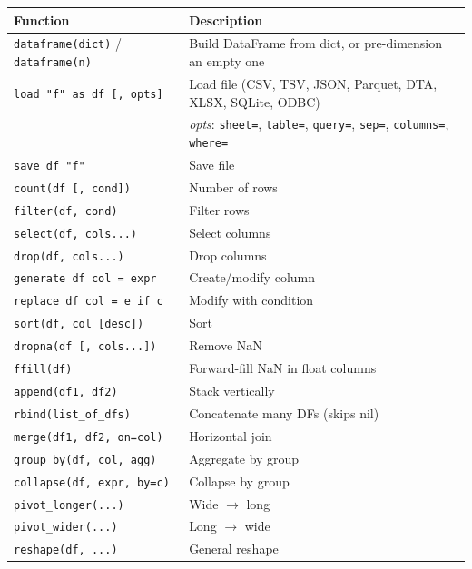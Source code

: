 \begin{center}
\begin{tabular}{ll}
\toprule
\textbf{Function} & \textbf{Description} \\
\midrule
\texttt{dataframe(dict)} / \texttt{dataframe(n)} & Build DataFrame from dict, or pre-dimension an empty one \\
\texttt{load "f" as df [, opts]}  & Load file (CSV, TSV, JSON, Parquet, DTA, XLSX, SQLite, ODBC) \\
                                  & \quad \textit{opts}: \texttt{sheet=}, \texttt{table=}, \texttt{query=}, \texttt{sep=}, \texttt{columns=}, \texttt{where=} \\
\texttt{save df "f"}              & Save file \\
\texttt{count(df [, cond])}       & Number of rows \\
\texttt{filter(df, cond)}         & Filter rows \\
\texttt{select(df, cols...)}      & Select columns \\
\texttt{drop(df, cols...)}        & Drop columns \\
\texttt{generate df col = expr}   & Create/modify column \\
\texttt{replace df col = e if c}  & Modify with condition \\
\texttt{sort(df, col [desc])}     & Sort \\
\texttt{dropna(df [, cols...])}   & Remove NaN \\
\texttt{ffill(df)}                & Forward-fill NaN in float columns \\
\texttt{append(df1, df2)}         & Stack vertically \\
\texttt{rbind(list\_of\_dfs)}     & Concatenate many DFs (skips nil) \\
\texttt{merge(df1, df2, on=col)}  & Horizontal join \\
\texttt{group\_by(df, col, agg)}  & Aggregate by group \\
\texttt{collapse(df, expr, by=c)} & Collapse by group \\
\texttt{pivot\_longer(...)}       & Wide $\to$ long \\
\texttt{pivot\_wider(...)}        & Long $\to$ wide \\
\texttt{reshape(df, ...)}         & General reshape \\
\bottomrule
\end{tabular}
\end{center}

